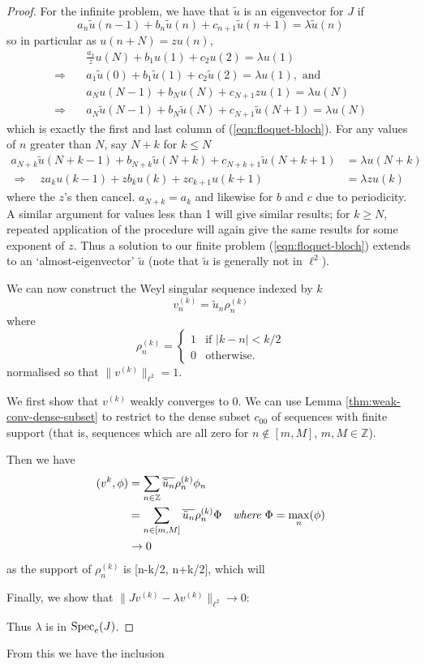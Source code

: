 \documentclass[../main.tex]{subfiles}
\begin{document}
\begin{proof} For the infinite problem, we have that $\tilde{u}$ is an
eigenvector for $J$ if
  $$a_n \tilde{u}(n-1) + b_n \tilde{u}(n) + c_{n+1} \tilde{u}(n+1) = \lambda \tilde{u}(n)$$
so in particular as $u(n + N) = z u(n)$, 
\begin{align*}
  & \frac{a_1}{z} u(N) + b_1 u(1) + c_2 u(2) = \lambda u(1)\\
  \Rightarrow \quad& a_1 \tilde{u}(0) + b_1 \tilde{u}(1) + c_2 \tilde{u}(2) 
	    = \lambda u(1), \text{ and } \\
  & a_N u(N-1) + b_N u(N) + c_{N+1} z u(1) = \lambda u(N)\\
  \Rightarrow \quad& a_N \tilde{u}(N-1) + b_N \tilde{u}(N) + c_{N+1} \tilde{u}(N+1) 
            = \lambda u(N)
\end{align*}
which is exactly the first and last column of (\ref{eqn:floquet-bloch}). For any values of
$n$ greater than $N$, say $N + k$ for $k \leq N$ 
\begin{align*}
  a_{N+k} \tilde{u}(N+k-1) + b_{N+k} \tilde{u}(N+k) + c_{N+k+1} \tilde{u}(N+k+1)
    & = \lambda u(N+k) \\
  \Rightarrow \quad z a_{k} u(k-1) + z b_{k} u(k) + z c_{k+1} u(k+1) & = \lambda z u(k)
\end{align*} 
where the $z$'s then cancel. $a_{N+k} = a_{k}$ and likewise for $b$ and $c$ due to periodicity.
A similar argument for values less than 1 will give similar results; for $k \geq N$, repeated
application of the procedure will again give the same results for some exponent of $z$.
Thus a solution to our finite problem (\ref{eqn:floquet-bloch}) extends to an `almost-eigenvector'
$\tilde{u}$ (note that $\tilde{u}$ is generally not in $\ell^2$).

We can now construct the Weyl singular sequence indexed by $k$
  $$v_n^{(k)} = \tilde{u}_n \rho_n^{(k)}$$
where 
  $$
  \rho_n^{(k)} =
  \begin{cases}
    1 & \text{if } |k-n| < k/2 \\
    0 & \text{otherwise.}
  \end{cases}
  $$
normalised so that $\|v^{(k)}\|_{\ell^2} = 1$. 

We first show that $v^{(k)}$ weakly converges to 0. We can use Lemma
\ref{thm:weak-conv-dense-subset} to restrict to the dense subset
$c_{00}$ of sequences with finite support (that is, sequences which are
all zero for $n \notin [m, M]$, $m, M \in \mathbb{Z}$).

Then we have
\begin{align*}
  (v^{k}, \phi) & =  \sum_{n \in \mathbb{Z}}
  \overline{\tilde{u}_n} \rho_n^{(k)} \phi_n & \\
  & = \sum_{n \in [m, M]} \overline{\tilde{u}_n} \rho_n^{(k)} \Phi 
    & \text{\emph{where $\Phi = \max_{n}(\phi)$}} \\
  & \rightarrow 0 & 
\end{align*}
as the support of $\rho_n^{(k)}$ is [n-k/2, n+k/2], which will 

Finally, we show that $\|Jv^{(k)} - \lambda v^{(k)}\|_{\ell^2} \rightarrow 0$:

Thus $\lambda$ is in $\mathrm{Spec}_e(J)$. \end{proof} From this we have the inclusion
\end{document}
